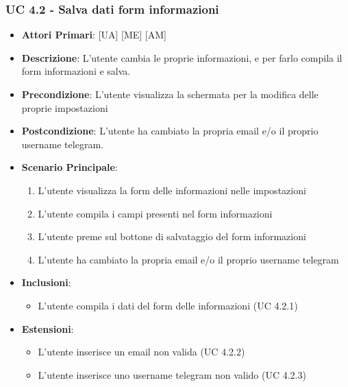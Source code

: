 			\subsubsection{UC 4.2 - Salva dati form informazioni}
			\begin{itemize}
				\item \textbf{Attori Primari}: [UA] [ME] [AM]
				\item \textbf{Descrizione}: L'utente cambia le proprie informazioni, e per farlo compila il form informazioni e salva.
				\item \textbf{Precondizione}: L'utente visualizza la schermata per la modifica delle proprie impostazioni
				\item \textbf{Postcondizione}: L'utente ha cambiato la propria email e/o il proprio username telegram.
				\item \textbf{Scenario Principale}:
				\begin{enumerate}
					\item{L'utente visualizza la form delle informazioni nelle impostazioni}
					\item{L'utente compila i campi presenti nel form informazioni}
					\item{L'utente preme sul bottone di salvataggio del form informazioni}
					\item{L'utente ha cambiato la propria email e/o il proprio username telegram}
				\end{enumerate}	
				\item \textbf{Inclusioni}:
					\begin{itemize}
						\item L'utente compila i dati del form delle informazioni (UC 4.2.1)
					\end{itemize}
				\item \textbf{Estensioni}:
					\begin{itemize}
						\item L'utente inserisce un email non valida (UC 4.2.2)
						\item L'utente inserisce uno username telegram non valido (UC 4.2.3)
					\end{itemize}
			\end{itemize}

